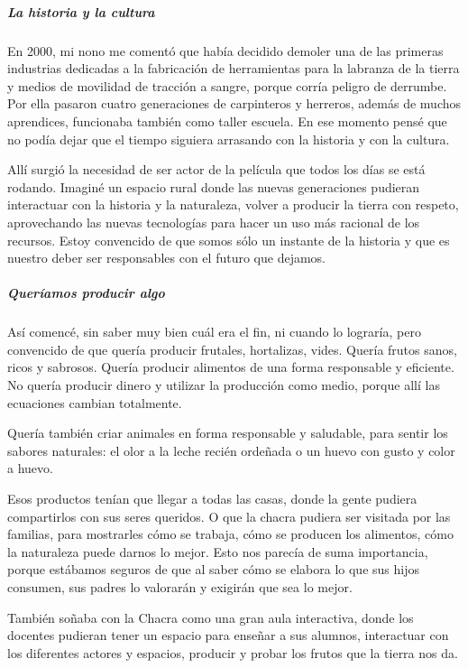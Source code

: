 \documentclass[
]{article}
\begin{document}
\hypertarget{la-historia-y-la-cultura}{%
\subparagraph{La historia y la cultura}\label{la-historia-y-la-cultura}}

En 2000, mi nono me comentó que había decidido demoler una de las
primeras industrias dedicadas a la fabricación de herramientas para la
labranza de la tierra y medios de movilidad de tracción a sangre, porque
corría peligro de derrumbe. Por ella pasaron cuatro generaciones de
carpinteros y herreros, además de muchos aprendices, funcionaba también
como taller escuela. En ese momento pensé que no podía dejar que el
tiempo siguiera arrasando con la historia y con la cultura.

Allí surgió la necesidad de ser actor de la película que todos los días
se está rodando. Imaginé un espacio rural donde las nuevas generaciones
pudieran interactuar con la historia y la naturaleza, volver a producir
la tierra con respeto, aprovechando las nuevas tecnologías para hacer un
uso más racional de los recursos. Estoy convencido de que somos sólo un
instante de la historia y que es nuestro deber ser responsables con el
futuro que dejamos.

\hypertarget{queruxedamos-producir-algo}{%
\subparagraph{Queríamos producir
algo}\label{queruxedamos-producir-algo}}

Así comencé, sin saber muy bien cuál era el fin, ni cuando lo lograría,
pero convencido de que quería producir frutales, hortalizas, vides.
Quería frutos sanos, ricos y sabrosos. Quería producir alimentos de una
forma responsable y eficiente. No quería producir dinero y utilizar la
producción como medio, porque allí las ecuaciones cambian totalmente.

Quería también criar animales en forma responsable y saludable, para
sentir los sabores naturales: el olor a la leche recién ordeñada o un
huevo con gusto y color a huevo.

Esos productos tenían que llegar a todas las casas, donde la gente
pudiera compartirlos con sus seres queridos. O que la chacra pudiera ser
visitada por las familias, para mostrarles cómo se trabaja, cómo se
producen los alimentos, cómo la naturaleza puede darnos lo mejor. Esto
nos parecía de suma importancia, porque estábamos seguros de que al
saber cómo se elabora lo que sus hijos consumen, sus padres lo valorarán
y exigirán que sea lo mejor.

También soñaba con la Chacra como una gran aula interactiva, donde los
docentes pudieran tener un espacio para enseñar a sus alumnos,
interactuar con los diferentes actores y espacios, producir y probar los
frutos que la tierra nos da.
\end{document}

